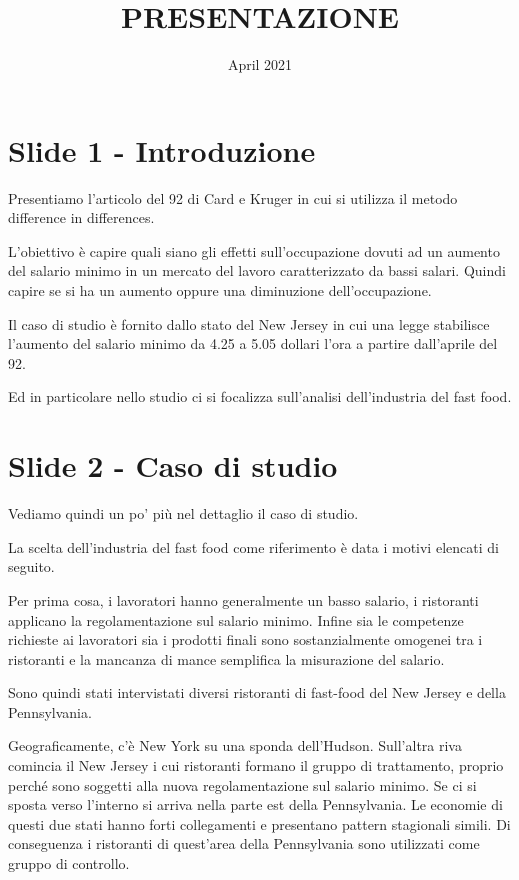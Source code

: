 \documentclass{article}
\title{PRESENTAZIONE}
\author{}
\date{April 2021}
\begin{document}
\maketitle

\section{Slide 1 - Introduzione} 

Presentiamo l'articolo del 92 di Card e Kruger in cui si utilizza il metodo difference in differences. 

L'obiettivo è capire quali siano gli effetti sull'occupazione dovuti ad un aumento del salario minimo in un mercato del lavoro caratterizzato da bassi salari. Quindi capire se si ha un aumento oppure una diminuzione dell'occupazione.

Il caso di studio è fornito dallo stato del New Jersey in cui una legge stabilisce l'aumento del salario minimo da 4.25 a 5.05 dollari l'ora a partire dall'aprile del 92.

Ed in particolare nello studio ci si focalizza sull'analisi dell'industria del fast food.

\section{Slide 2 - Caso di studio} 
Vediamo quindi un po' più nel dettaglio il caso di studio. 

La scelta dell'industria del fast food come riferimento è data i motivi elencati di seguito. 

Per prima cosa, i lavoratori hanno generalmente un basso salario, i ristoranti applicano la regolamentazione sul salario minimo. Infine sia le competenze richieste ai lavoratori sia i prodotti finali sono sostanzialmente omogenei tra i ristoranti e la mancanza di mance semplifica la misurazione del salario.

Sono quindi stati intervistati diversi ristoranti di fast-food del New Jersey e della Pennsylvania.

Geograficamente, c'è New York su una sponda dell'Hudson. Sull'altra riva comincia il New Jersey i cui ristoranti formano il gruppo di trattamento, proprio perché sono soggetti alla nuova regolamentazione sul salario minimo. Se ci si sposta verso l'interno si arriva nella parte est della Pennsylvania. Le economie di questi due stati hanno forti collegamenti e presentano pattern stagionali simili. Di conseguenza i ristoranti di quest'area della Pennsylvania sono utilizzati come gruppo di controllo.
\end{document}

